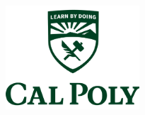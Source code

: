 \documentclass[
    a4paper, %
	12pt, %
    ]{CSSullivanBusinessReport}
\begin{document}

\thispagestyle{empty} %

\begin{fullwidth} %
	\vspace*{-0.075\textheight} %
	
	\hfill\includegraphics[width=5cm]{creodocs_logo.pdf} %

	\vspace{0.15\textheight} %

	\parbox{0.9\fulltextwidth}{\fontsize{50pt}{52pt}\selectfont\raggedright\textbf{\reporttitle}\par} %
	
	\vspace{0.03\textheight} %
	
	{\LARGE\textit{\textbf{\reportsubtitle}}\par} %
	
	\vfill %
	
	{\Large\reportauthors\par} %
	
	\vfill\vfill\vfill %
	
	{\large\reportdate\par} %
\end{fullwidth}

\newpage

\end{document}
